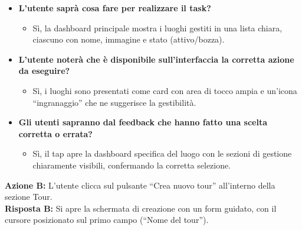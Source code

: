 \begin{itemize}[nosep, leftmargin=1.6em]
    \item \textbf{L'utente saprà cosa fare per realizzare il task?}
    \begin{itemize}[nosep, leftmargin=1.6em]
        \item Sì, la dashboard principale mostra i luoghi gestiti in una lista chiara, ciascuno con nome, immagine e stato (attivo/bozza).
    \end{itemize}
    \item \textbf{L'utente noterà che è disponibile sull'interfaccia la corretta azione da eseguire?}
    \begin{itemize}[nosep, leftmargin=1.6em]
        \item Sì, i luoghi sono presentati come card con area di tocco ampia e un'icona ``ingranaggio'' che ne suggerisce la gestibilità.
    \end{itemize}
    \item \textbf{Gli utenti sapranno dal feedback che hanno fatto una scelta corretta o errata?}
    \begin{itemize}[nosep, leftmargin=1.6em]
        \item Sì, il tap apre la dashboard specifica del luogo con le sezioni di gestione chiaramente visibili, confermando la corretta selezione.
    \end{itemize}
\end{itemize}

\vspace{0.3cm}
\noindent\textbf{Azione B:} L'utente clicca sul pulsante ``Crea nuovo tour'' all'interno della sezione Tour.\\
\textbf{Risposta B:} Si apre la schermata di creazione con un form guidato, con il cursore posizionato sul primo campo (``Nome del tour'').

